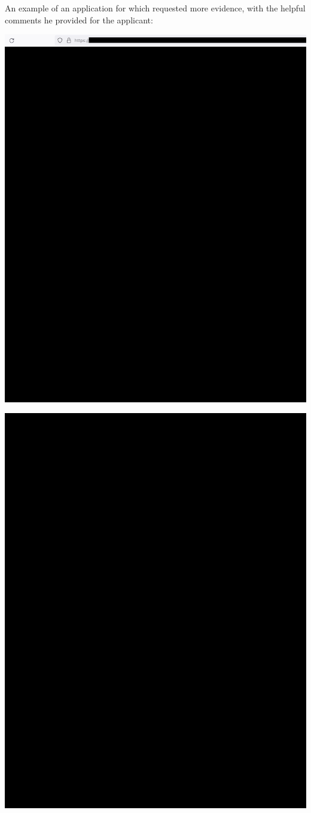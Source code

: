 An example of an application for which \mrl requested more evidence,
with the helpful comments he provided for the applicant:

\begin{center}
    \includegraphics[width=40em]{rfe-p1_public}
\end{center}
\WillContinue
\pagebreak

\Continuing
\begin{center}
    \includegraphics[width=40em]{rfe-p2_public}
\end{center}

\pagebreak
